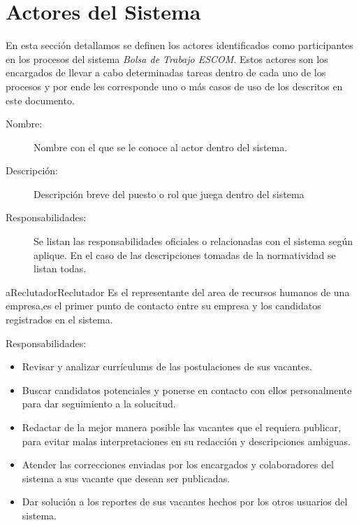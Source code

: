 \chapter{Actores del Sistema}
En esta sección detallamos se definen los actores identificados como participantes en los procesos del sistema 
\textit{Bolsa de Trabajo ESCOM}. Estos actores son los encargados de llevar a cabo determinadas tareas dentro de cada uno de los 
procesos y por ende les corresponde uno o más casos de uso de los descritos en este documento.


\begin{description}
	\item[Nombre:] Nombre con el que se le conoce al actor dentro del sistema.
	\item[Descripción:] Descripción breve del puesto o rol que juega dentro del sistema
	\item[Responsabilidades:] Se listan las responsabilidades oficiales o relacionadas con el sistema según aplique. En el caso de las descripciones tomadas de la normatividad se listan todas.
\end{description}

\begin{actor}{aReclutador}{Reclutador}{%
   Es el representante del area de recursos humanos de una empresa,es el primer punto de contacto entre su empresa y los candidatos registrados en el sistema.}
    \item[Responsabilidades:] \hfill
    \begin{itemize}
        \item  Revisar y analizar currículums de las postulaciones de sus vacantes.
        \item  Buscar candidatos potenciales y ponerse en contacto con ellos personalmente para dar seguimiento a la solucitud.
        \item  Redactar de la mejor manera posible las vacantes que el requiera publicar, para evitar malas interpretaciones 
        en su redacción y descripciones ambiguas.
        \item  Atender las correcciones enviadas por los encargados y colaboradores del sistema a sus vacante que desean ser publicadas.
        \item Dar solución a los reportes de sus vacantes hechos por los otros usuarios del sistema.
    \end{itemize}
\end{actor}

